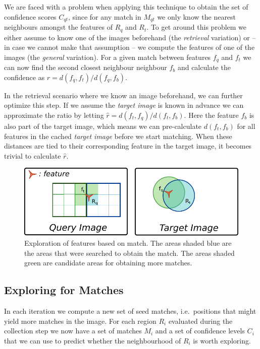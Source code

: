 \documentclass[10pt,twocolumn,letterpaper]{article}
\begin{document}
We are faced with a problem when applying this technique to obtain the set of confidence scores $C_{qt}$, since for any match in $M_{qt}$ we only know the nearest neighbours amongst the features of $R_q$ and $R_t$. To get around this problem we either assume to know one of the images beforehand (the \emph{retrieval} variation) or -- in case we cannot make that assumption -- we compute the features of one of the images (the \emph{general} variation). For a given match between features $f_q$ and $f_t$ we can now find the second closest neighbour neighbour $f_b$ and calculate the confidence as $r = d(f_q, f_t)/d(f_q,f_b)$.

In the retrieval scenario where we know an image beforehand, we can further optimize this step. If we assume the \emph{target image} is known in advance we can approximate the ratio by letting $\hat r = d(f_t, f_q)/d(f_t,f_b)$. Here the feature $f_b$ is also part of the target image, which means we can pre-calculate $d(f_t, f_b)$ for all features in the cached \emph{target image} before we start matching. When these distances are tied to their corresponding feature in the target image, it becomes trivial to calculate $\hat r$.

\begin{figure}[t]
\centering
\includegraphics[width=0.75\columnwidth]{images/exploration}
\caption{Exploration of features based on match. The areas shaded blue are the areas that were searched to obtain the match. The areas shaded green are candidate areas for obtaining more matches.}
\label{fig:exploration}
\end{figure}

\subsection{Exploring for Matches}
\label{exploring}
%
In each iteration we compute a new set of seed matches, i.e.\ positions that might yield more matches in the image. For each region $R_i$ evaluated during the collection step we now have a set of matches $M_i$ and a set of confidence levels $C_i$ that we can use to predict whether the neighbourhood of $R_i$ is worth exploring.
\end{document}
